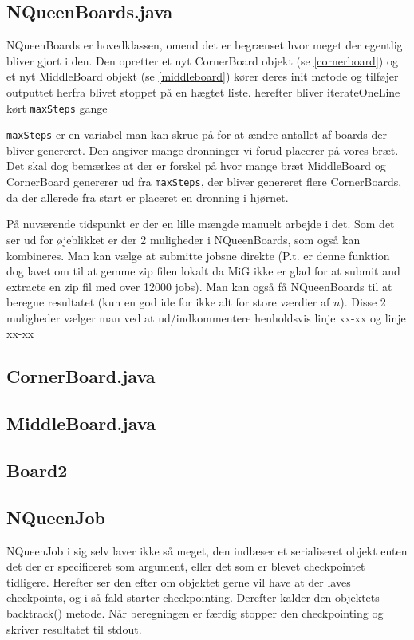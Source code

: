 \documentclass[draft,a4paper,11pt]{article}
\begin{document}
\subsection{NQueenBoards.java}

NQueenBoards er hovedklassen, omend det er begrænset hvor meget der egentlig
bliver gjort i den. Den opretter et nyt CornerBoard objekt (se
\ref{cornerboard}) og et nyt MiddleBoard objekt (se \ref{middleboard})
kører deres init metode og tilføjer outputtet herfra blivet stoppet på en hægtet
liste. 
herefter bliver iterateOneLine kørt \texttt{maxSteps} gange

\texttt{maxSteps} er en variabel man kan skrue på for at
ændre antallet af boards der bliver genereret. Den angiver mange dronninger vi
forud placerer på vores bræt. Det skal dog bemærkes at der er forskel på hvor
mange bræt MiddleBoard og CornerBoard genererer ud fra \texttt{maxSteps}, der
bliver genereret flere CornerBoards, da der allerede fra start er placeret en
dronning i hjørnet.

På nuværende tidspunkt er der en lille mængde manuelt arbejde i det. Som det ser
ud for øjeblikket er der 2 muligheder i NQueenBoards, som også kan kombineres. 
Man kan vælge at submitte jobsne direkte (P.t. er denne funktion dog lavet om
til at gemme zip filen lokalt da MiG ikke er glad for at submit and extracte en
zip fil med over 12000 jobs). Man kan også få NQueenBoards til at beregne
resultatet (kun en god ide for ikke alt for store værdier af $n$). Disse 2
muligheder vælger man ved at ud/indkommentere henholdsvis linje xx-xx og linje
xx-xx 

\subsection{CornerBoard.java}

\subsection{MiddleBoard.java}

\subsection{Board2}

\subsection{NQueenJob}

NQueenJob i sig selv laver ikke så meget, den indlæser et serialiseret objekt
enten det der er specificeret som argument, eller det som er blevet checkpointet
tidligere. Herefter ser den efter om objektet gerne vil have at der laves
checkpoints, og i så fald starter checkpointing. Derefter kalder den objektets
backtrack() metode. Når beregningen er færdig stopper den checkpointing og
skriver resultatet til stdout.
\end{document}
